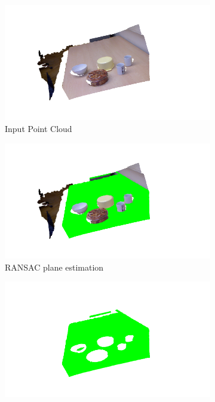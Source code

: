 \begin{figure}[htp]
\centering
\begin{subfigure}[t]{0.32\textwidth}
\includegraphics[width = 1.1\textwidth]{Img/ObjectSegmentation/pcl.png}
\caption{Input Point Cloud}\label{img:obj_pointcloud}
\end{subfigure}
\begin{subfigure}[t]{0.32\textwidth}
\includegraphics[width = 1.1\textwidth]{Img/ObjectSegmentation/ransac.png}
\caption{RANSAC plane estimation}\label{img:obj_ransac}
\end{subfigure}
\begin{subfigure}[t]{0.32\textwidth}
\includegraphics[width = 1.1\textwidth]{Img/ObjectSegmentation/plane.png}

\end{subfigure}
\end{figure}
